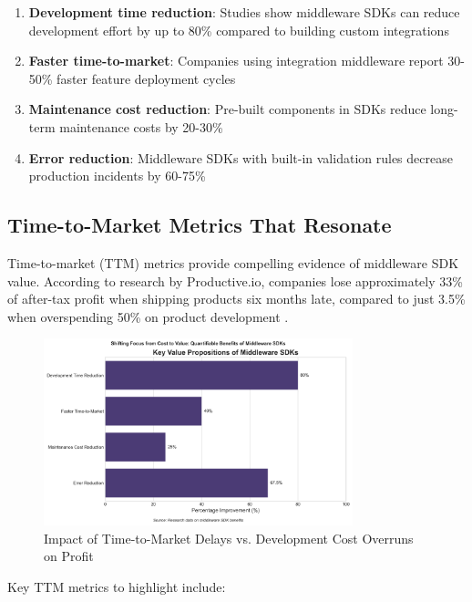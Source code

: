 \documentclass[11pt,a4paper]{article}
\begin{document}
\begin{enumerate}
    \item \textbf{Development time reduction}: Studies show middleware SDKs can reduce development effort by up to 80\% compared to building custom integrations \citep{prismatic2024roi}
    \item \textbf{Faster time-to-market}: Companies using integration middleware report 30-50\% faster feature deployment cycles \citep{aws2022nnamu}
    \item \textbf{Maintenance cost reduction}: Pre-built components in SDKs reduce long-term maintenance costs by 20-30\% \citep{haveignition2024kpis}
    \item \textbf{Error reduction}: Middleware SDKs with built-in validation rules decrease production incidents by 60-75\% \citep{haveignition2024kpis}
\end{enumerate}

\subsection{Time-to-Market Metrics That Resonate}

Time-to-market (TTM) metrics provide compelling evidence of middleware SDK value. According to research by Productive.io, companies lose approximately 33\% of after-tax profit when shipping products six months late, compared to just 3.5\% when overspending 50\% on product development \citep{Jurcic2025}.

\begin{figure}[htbp]
    \centering
    \includegraphics[width=0.8\textwidth]{figures/visualization-20250510125949.png}
    \caption{Impact of Time-to-Market Delays vs. Development Cost Overruns on Profit}
    \label{fig:ttm-impact}
\end{figure}

Key TTM metrics to highlight include:
\end{document}
